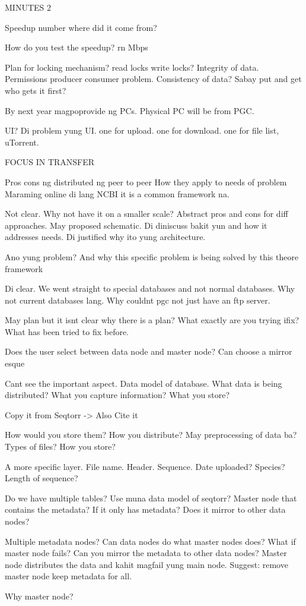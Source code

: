 
MINUTES 2

Speedup number where did it come from?

How do you test the speedup? rn Mbps

Plan for locking mechanism? read locks write locks? Integrity of data. Permissions producer consumer problem. Consistency of data? Sabay put and get who gets it first?

By next year magpoprovide ng PCs. Physical PC will be from PGC.

UI? Di problem yung UI.
one for upload.
one for download.
one for file list, uTorrent.

FOCUS IN TRANSFER

Pros cons ng distributed ng peer to peer
How they apply to needs of problem
Maraming online di lang NCBI it is a common framework na.

Not clear. Why not have it on a smaller scale? Abstract pros and cons for diff approaches. May proposed schematic. Di diniscuss bakit yun and how it addresses needs. Di justified why ito yung architecture.

Ano yung problem? And why this specific problem is being solved by this theore framework

Di clear. We went straight to special databases and not normal databases. Why not current databases lang. Why couldnt pgc not just have an ftp server.

May plan but it isnt clear why there is a plan? What exactly are you trying ifix? What has been tried to fix before.

Does the user select between data node and master node? Can choose a mirror esque

Cant see the important aspect. Data model of database. What data is being distributed? What you capture information? What you store?

Copy it from Seqtorr -> Also Cite it

How would you store them? How you distribute? May preprocessing of data ba? Types of files? How you store?

A more specific layer. File name. Header. Sequence. Date uploaded? Species? Length of sequence?

Do we have multiple tables? Use muna data model of seqtorr? Master node that contains the metadata? If it only has metadata? Does it mirror to other data nodes?

Multiple metadata nodes? Can data nodes do what master nodes does? What if master node fails? Can you mirror the metadata to other data nodes? Master node distributes the data and kahit magfail yung main node. Suggest: remove master node keep metadata for all.

Why master node?